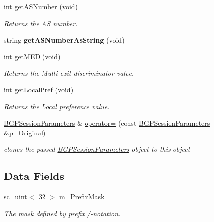 \begin{DoxyCompactItemize}
int \hyperlink{classBGPSessionParameters_afc93bac9efde675d8071894ee95c021a}{get\-A\-S\-Number} (void)
\begin{DoxyCompactList}\small\item\em Returns the A\-S number. \end{DoxyCompactList}\item 
\hypertarget{classBGPSessionParameters_a740e52b61810ef405acc6ade93e796b4}{string {\bfseries get\-A\-S\-Number\-As\-String} (void)}\label{classBGPSessionParameters_a740e52b61810ef405acc6ade93e796b4}

\item 
int \hyperlink{classBGPSessionParameters_ab3f7cbe1af9f3ce6965042ea39250cb9}{get\-M\-E\-D} (void)
\begin{DoxyCompactList}\small\item\em Returns the Multi-\/exit discriminator value. \end{DoxyCompactList}\item 
int \hyperlink{classBGPSessionParameters_a4ee03778f9715e90243fc16a47514f64}{get\-Local\-Pref} (void)
\begin{DoxyCompactList}\small\item\em Returns the Local preference value. \end{DoxyCompactList}\item 
\hyperlink{classBGPSessionParameters}{B\-G\-P\-Session\-Parameters} \& \hyperlink{classBGPSessionParameters_aa15e1258ca1d21dabb6d146a38a051cb}{operator=} (const \hyperlink{classBGPSessionParameters}{B\-G\-P\-Session\-Parameters} \&p\-\_\-\-Original)
\begin{DoxyCompactList}\small\item\em clones the passed \hyperlink{classBGPSessionParameters}{B\-G\-P\-Session\-Parameters} object to this object \end{DoxyCompactList}\end{DoxyCompactItemize}
\subsection*{Data Fields}
\begin{DoxyCompactItemize}
\item 
\hypertarget{classBGPSessionParameters_aa7bb99315626377510fd16ba688a3ff4}{sc\-\_\-uint$<$ 32 $>$ \hyperlink{classBGPSessionParameters_aa7bb99315626377510fd16ba688a3ff4}{m\-\_\-\-Prefix\-Mask}}\label{classBGPSessionParameters_aa7bb99315626377510fd16ba688a3ff4}

\begin{DoxyCompactList}\small\item\em The mask defined by prefix /-\/notation. \end{DoxyCompactList}\end{DoxyCompactItemize}
